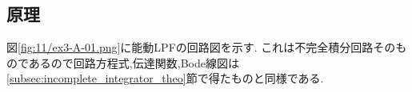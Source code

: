 \subsection{原理}
図\ref{fig:11/ex3-A-01.png}に能動LPFの回路図を示す.
これは不完全積分回路そのものであるので回路方程式,伝達関数,Bode線図は\ref{subsec:incomplete_integrator_theo}節で得たものと同様である.
